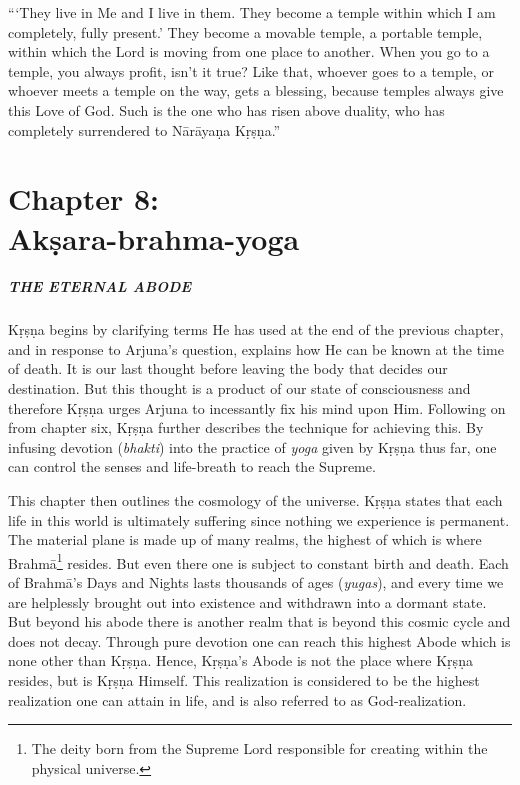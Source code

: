 \documentclass[12pt, twoside, openright]{memoir}
\begin{document}
\enquote{\enquote{They live in Me and I live in them. They become a temple within which I am completely, fully present.} They become a movable temple, a portable temple, within which the Lord is moving from one place to another. When you go to a temple, you always profit, isn’t it true? Like that, whoever goes to a temple, or whoever meets a temple on the way, gets a blessing, because temples always give this Love of God. Such is the one who has risen above duality, who has completely surrendered to Nārāyaṇa Kṛṣṇa.}
 \chapter{Chapter 8: \\Akṣara-brahma-yoga}\label{chap-aksara-brahma-yoga}

\paragraph*{\MakeUppercase{The Eternal Abode}}


\noindent Kṛṣṇa begins by clarifying terms He has used at the end of the previous chapter, and in response to Arjuna’s question, explains how He can be known at the time of death. It is our last thought before leaving the body that decides our destination. But this thought is a product of our state of consciousness and therefore Kṛṣṇa urges Arjuna to incessantly fix his mind upon Him. Following on from chapter six, Kṛṣṇa further describes the technique for achieving this. By infusing devotion (\textit{bhakti}) into the practice of \textit{yoga} given by Kṛṣṇa thus far, one can control the senses and life-breath to reach the Supreme.

This chapter then outlines the cosmology of the universe. Kṛṣṇa states that each life in this world is ultimately suffering since nothing we experience is permanent. The material plane is made up of many realms, the highest of which is where Brahmā\footnote{The deity born from the Supreme Lord responsible for creating within the physical universe.} resides. But even there one is subject to constant birth and death. Each of Brahmā’s Days and Nights lasts thousands of ages (\textit{yugas}), and every time we are helplessly brought out into existence and withdrawn into a dormant state. But beyond his abode there is another realm that is beyond this cosmic cycle and does not decay. Through pure devotion one can reach this highest Abode which is none other than Kṛṣṇa. Hence, Kṛṣṇa's Abode is not the place where Kṛṣṇa resides, but is Kṛṣṇa Himself. This realization is considered to be the highest realization one can attain in life, and is also referred to as God-realization.
\end{document}
